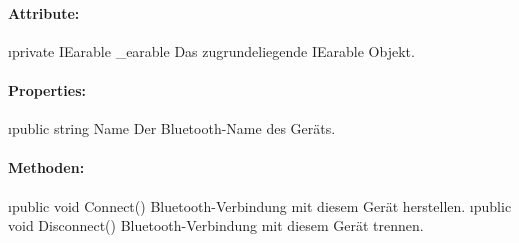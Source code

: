 \documentclass[../entwurf.tex]{subfiles}
\begin{document}
				\paragraph{Attribute:}
					\begin{itemize}
						\i{private IEarable \_earable} Das zugrundeliegende IEarable Objekt.
					\end{itemize}
				\paragraph{Properties:}
					\begin{itemize}
						\i{public string Name} Der Bluetooth-Name des Geräts.
					\end{itemize}
				\paragraph{Methoden:}
					\begin{itemize}
						\i{public void Connect()} Bluetooth-Verbindung mit diesem Gerät herstellen.
						\i{public void Disconnect()} Bluetooth-Verbindung mit diesem Gerät trennen.
					\end{itemize}
					
\end{document}
